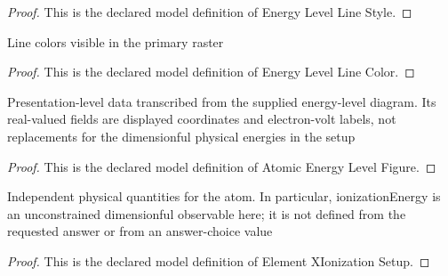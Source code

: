 \begin{proof}
  This is the declared model definition of Energy Level Line Style.
\end{proof}
\begin{definition}
  \label{def:physics:phyx-mini-0644:phyxminiproblems-problemphyxmini0644-energylevellinecolor}
  Line colors visible in the primary raster
\end{definition}
\begin{proof}
  This is the declared model definition of Energy Level Line Color.
\end{proof}
\begin{definition}
  \label{def:physics:phyx-mini-0644:phyxminiproblems-problemphyxmini0644-atomicenergylevelfigure}
  Presentation-level data transcribed from the supplied energy-level diagram. Its real-valued fields are displayed coordinates and electron-volt labels, not replacements for the dimensionful physical energies in the setup
\end{definition}
\begin{proof}
  This is the declared model definition of Atomic Energy Level Figure.
\end{proof}
\begin{definition}
  \label{def:physics:phyx-mini-0644:phyxminiproblems-problemphyxmini0644-elementxionizationsetup}
  Independent physical quantities for the atom. In particular, ionizationEnergy is an unconstrained dimensionful observable here; it is not defined from the requested answer or from an answer-choice value
\end{definition}
\begin{proof}
  This is the declared model definition of Element XIonization Setup.
\end{proof}
